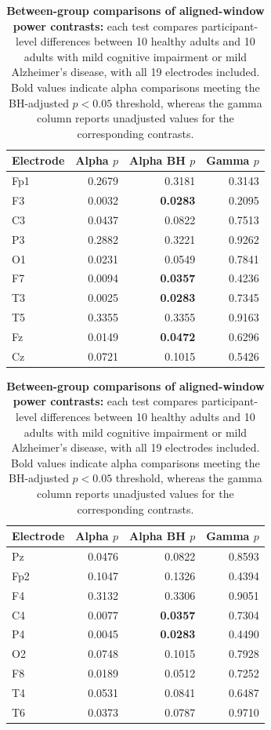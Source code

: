 \documentclass[11pt,letterpaper]{article}
\begin{document}
\begin{table}[H]
\centering
\caption{\textbf{Between-group comparisons of aligned-window power contrasts:} each test compares participant-level differences between 10 healthy adults and 10 adults with mild cognitive impairment or mild Alzheimer's disease, with all 19 electrodes included. Bold values indicate alpha comparisons meeting the BH-adjusted \(p<0.05\) threshold, whereas the gamma column reports unadjusted values for the corresponding contrasts.}
\label{tab:tests}
\small
\setlength{\tabcolsep}{6pt}
\renewcommand{\arraystretch}{1.00}
\begin{tabular}[t]{lrrr}
\toprule
Electrode & Alpha \(p\) & Alpha BH \(p\) & Gamma \(p\) \\
\midrule
Fp1 & 0.2679 & 0.3181 & 0.3143 \\
F3 & 0.0032 & \textbf{0.0283} & 0.2095 \\
C3 & 0.0437 & 0.0822 & 0.7513 \\
P3 & 0.2882 & 0.3221 & 0.9262 \\
O1 & 0.0231 & 0.0549 & 0.7841 \\
F7 & 0.0094 & \textbf{0.0357} & 0.4236 \\
T3 & 0.0025 & \textbf{0.0283} & 0.7345 \\
T5 & 0.3355 & 0.3355 & 0.9163 \\
Fz & 0.0149 & \textbf{0.0472} & 0.6296 \\
Cz & 0.0721 & 0.1015 & 0.5426 \\
\bottomrule
\end{tabular}\hspace{18pt}
\begin{tabular}[t]{lrrr}
\toprule
Electrode & Alpha \(p\) & Alpha BH \(p\) & Gamma \(p\) \\
\midrule
Pz & 0.0476 & 0.0822 & 0.8593 \\
Fp2 & 0.1047 & 0.1326 & 0.4394 \\
F4 & 0.3132 & 0.3306 & 0.9051 \\
C4 & 0.0077 & \textbf{0.0357} & 0.7304 \\
P4 & 0.0045 & \textbf{0.0283} & 0.4490 \\
O2 & 0.0748 & 0.1015 & 0.7928 \\
F8 & 0.0189 & 0.0512 & 0.7252 \\
T4 & 0.0531 & 0.0841 & 0.6487 \\
T6 & 0.0373 & 0.0787 & 0.9710 \\
\bottomrule
\end{tabular}
\end{table}
\end{document}
